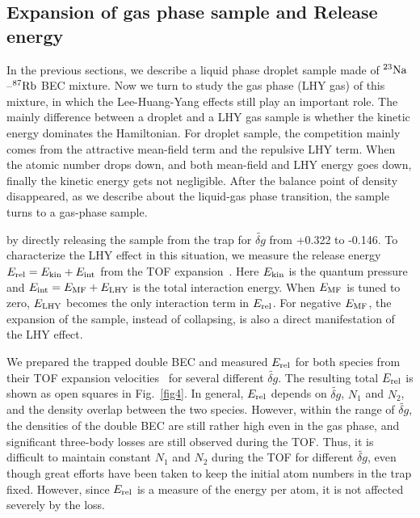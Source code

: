 \subsection{Expansion of gas phase sample and Release energy}
In the previous sections, we describe a liquid phase droplet sample made of $^{23}\rm Na$--$^{87}\rm Rb$ BEC mixture. Now we turn to study the gas phase (LHY gas) of this mixture, in which the Lee-Huang-Yang effects still play an important role. The mainly difference between a droplet and a LHY gas sample is whether the kinetic energy dominates the Hamiltonian. For droplet sample, the competition mainly comes from the attractive mean-field term and the repulsive LHY term. When the atomic number drops down, and both mean-field and LHY energy goes down, finally the kinetic energy gets not negligible. After the balance point of density disappeared, as we describe about the liquid-gas phase transition, the sample turns to a gas-phase sample.

by directly releasing the sample from the trap for $\widetilde{\delta g}$ from +0.322 to -0.146.
To characterize the LHY effect in this situation, we measure the release energy $E_{\rm rel}=E_{\rm kin}+E_{\rm int}$ from the TOF expansion~\cite{Holland1997,Mewes1996}. Here $E_\text{\rm kin}$ is the quantum pressure and $E_{\rm int}=E_{\rm MF}+E_{\rm LHY}$ is the total interaction energy. When $E_{\rm MF}$ is tuned to zero, $E_{\rm LHY}$ becomes the only interaction term in $E_{\rm rel}$. For negative $E_{\rm MF}$, the expansion of the sample, instead of collapsing, is also a direct manifestation of the LHY effect. 

We prepared the trapped double BEC and measured $E_{\rm rel}$ for both species from their TOF expansion velocities~\cite{Holland1997} for several different $\widetilde{\delta g}$. The resulting total $E_{\rm rel}$ is shown as open squares in Fig.~\ref{fig4}. In general, $E_{\rm rel}$ depends on $\widetilde{\delta g}$, $N_1$ and $N_2$, and the density overlap between the two species. However, within the range of $\widetilde{\delta g}$, the densities of the double BEC are still rather high even in the gas phase, and significant three-body losses are still observed during the TOF. Thus, it is difficult to maintain constant $N_1$ and $N_2$ during the TOF for different $\widetilde{\delta g}$, even though great efforts have been taken to keep the initial atom numbers in the trap fixed. However, since $E_{\rm rel}$ is a measure of the energy per atom, it is not affected severely by the loss. 

